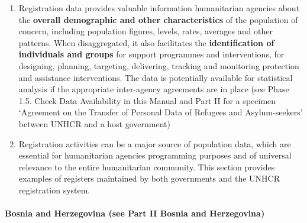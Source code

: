 \documentclass[
]{article}
\begin{document}
\begin{enumerate}
\def\labelenumi{\arabic{enumi}.}
\setcounter{enumi}{172}
\item
  Registration data provides valuable information humanitarian
  agencies about the \textbf{overall demographic and other characteristics}
  of the population of concern, including population figures, levels,
  rates, averages and other patterns. When disaggregated, it also
  facilitates the \textbf{identification of individuals and groups} for
  support programmes and interventions, for designing, planning,
  targeting, delivering, tracking and monitoring protection and
  assistance interventions. The data is potentially available for
  statistical analysis if the appropriate inter-agency agreements are
  in place (see Phase 1.5. Check Data Availability in this Manual and
  Part II for a specimen `Agreement on the Transfer of Personal Data
  of Refugees and Asylum-seekers' between UNHCR and a host government)
\item
  Registration activities can be a major source of population data,
  which are essential for humanitarian agencies programming purposes
  and of universal relevance to the entire humanitarian community.
  This section provides examples of registers maintained by both
  governments and the UNHCR registration system.
\end{enumerate}

\hypertarget{bosnia-and-herzegovina-see-part-ii-bosnia-and-herzegovina-1}{%
\paragraph{Bosnia and Herzegovina (see Part II Bosnia and Herzegovina)}\label{bosnia-and-herzegovina-see-part-ii-bosnia-and-herzegovina-1}}
\end{document}
